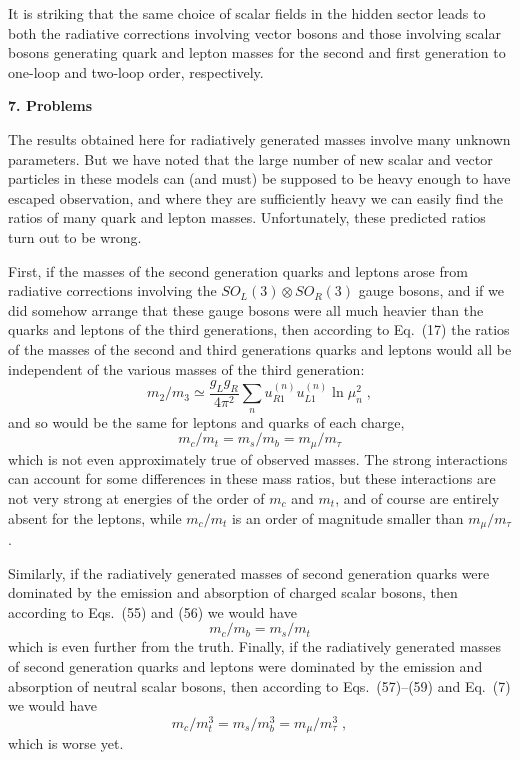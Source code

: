 \documentclass[12pt]{article}
\begin{document}
It is striking that the same choice of scalar fields in the hidden sector leads to both the radiative corrections involving vector bosons and those involving scalar bosons generating  quark and lepton masses for the second and first generation  to one-loop and two-loop order, respectively.


\begin{center}
{\bf 7.   Problems}
\end{center}

The results obtained here for radiatively generated masses  involve many unknown parameters.  But we have noted that the large number of new scalar and vector particles in these models can (and must) be supposed to be heavy enough to have escaped observation, and where they are sufficiently heavy we can easily find the ratios of many  quark and lepton masses.   Unfortunately, these predicted ratios turn out to be wrong.

First,  if the masses of the second generation quarks and leptons arose from radiative corrections involving the $SO_L(3)\otimes  SO_R(3)$ gauge bosons, and if we did somehow arrange that these gauge bosons were all much heavier than the quarks and leptons of the third generations, then according to Eq.~(17) the ratios of the masses of the second and third generations  quarks and leptons would all be independent of the various masses of the third generation:
\begin{equation}
m_2/m_3\simeq \frac{g_Lg_R }{4\pi^2}\sum_{n}  u_{R1}^{(n)}u_{L1}^{(n)}\ln \mu_n^2
\;,
\end{equation}
 and so would be the same  for leptons and quarks of each charge, 
\begin{equation}
m_c/m_t=m_s/m_b=m_\mu/m_\tau
\end{equation}
which is not even approximately true of observed masses.  The strong interactions can account for some differences in these mass ratios, but these interactions are not very strong at energies of the order of $m_c$ and $m_t$, and of course are entirely absent for the leptons, while $m_c/m_t$ is an order of magnitude smaller than  $m_\mu/m_\tau$.  

Similarly, if the radiatively generated masses of second generation quarks were dominated by the emission and absorption of charged scalar bosons, then according to Eqs.~(55) and (56) we would have 
\begin{equation}
m_c/m_b=m_s/m_t
\end{equation}
which is even further from the truth.  Finally, if the radiatively generated masses of second generation quarks and leptons were dominated by the emission and absorption of neutral scalar bosons, then according to Eqs.~(57)--(59) and Eq.~(7) we would have 
\begin{equation}
m_c/m_t^3=m_s/m_b^3=m_\mu/m_\tau^3\;,
\end{equation}
which is worse yet.  
\end{document}
